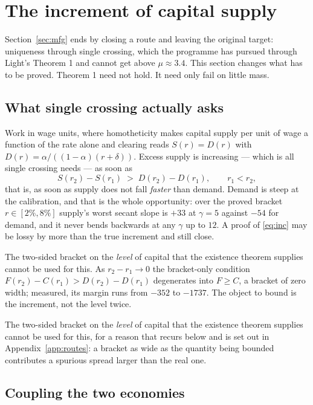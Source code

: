 \section{The increment of capital supply}\label{sec:inc}

Section~\ref{sec:mfg} ends by closing a route and leaving the original target: uniqueness through
single crossing, which the programme has pursued through Light's Theorem 1 and cannot get above
$\mu\approx3.4$. This section changes what has to be proved. Theorem 1 need not hold. It need only
fail on little mass.

\subsection{What single crossing actually asks}

Work in wage units, where homotheticity makes capital supply per unit of wage a function of the rate
alone and clearing reads $S(r)=D(r)$ with $D(r)=\alpha/((1-\alpha)(r+\delta))$. Excess supply is
increasing --- which is all single crossing needs --- as soon as
\begin{equation}\label{eq:inc}
  S(r_2)-S(r_1)\;>\;D(r_2)-D(r_1),\qquad r_1<r_2,
  \tag{I}
\end{equation}
that is, as soon as supply does not fall \emph{faster} than demand. Demand is steep at the
calibration, and that is the whole opportunity: over the proved bracket $r\in[2\%,8\%]$ supply's
worst secant slope is $+33$ at $\gamma=5$ against $-54$ for demand, and it never bends backwards at
any $\gamma$ up to $12$. A proof of \eqref{eq:inc} may be lossy by more than the true increment and
still close.

The two-sided bracket on the \emph{level} of capital that the existence theorem supplies cannot be
used for this. As $r_2-r_1\to0$ the bracket-only condition $F(r_2)-C(r_1)>D(r_2)-D(r_1)$ degenerates
into $F\ge C$, a bracket of zero width; measured, its margin runs from $-352$ to $-1737$. The object
to bound is the increment, not the level twice.

The two-sided bracket on the \emph{level} of capital that the existence theorem supplies
cannot be used for this, for a reason that recurs below and is set out in
Appendix~\ref{app:routes}: a bracket as wide as the quantity being bounded contributes a
spurious spread larger than the real one.

\subsection{Coupling the two economies}

